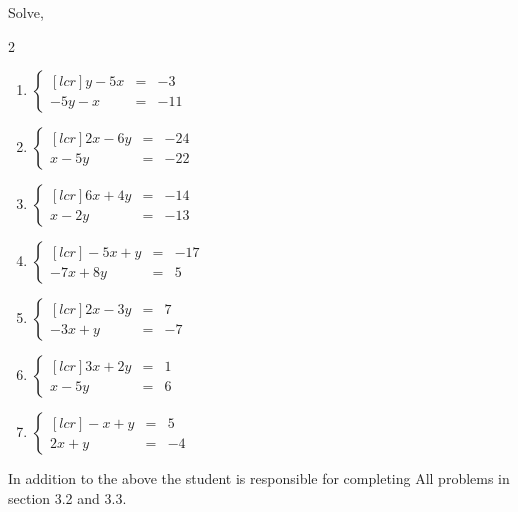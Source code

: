 \documentclass[12pt]{article}
\newenvironment{problem}[2][Problem]{\begin{trivlist}
\item[\hskip \labelsep {\bfseries #1}\hskip \labelsep {\bfseries #2.}]}{\end{trivlist}}
\begin{document}
\begin{problem}{2}
  Solve,
  \begin{multicols}{2}
  \begin{enumerate}[label=\roman*)]
  \item $\displaystyle \left\{\begin{aligned}[lcr] y-5x & = &  -3 \\ -5y-x & = &  -11 \end{aligned}\right.$
  \item $\displaystyle \left\{\begin{aligned}[lcr] 2x-6y & = &  -24 \\ x-5y & = &  -22 \end{aligned}\right.$
  \item $\displaystyle \left\{\begin{aligned}[lcr] 6x+4y & = &  -14 \\ x-2y & = &  -13 \end{aligned}\right.$
  \item $\displaystyle \left\{\begin{aligned}[lcr] -5x+y & = &  -17 \\ -7x+8y & = & 5 \end{aligned}\right.$
  \item $\displaystyle \left\{\begin{aligned}[lcr] 2x-3y & = &  7 \\ -3x+y & = &  -7 \end{aligned}\right.$
  \item $\displaystyle \left\{\begin{aligned}[lcr] 3x+2y & = &  1 \\ x-5y & = &  6 \end{aligned}\right.$
    \item $\displaystyle \left\{\begin{aligned}[lcr] -x+y & = &  5 \\ 2x+y & = &  -4 \end{aligned}\right.$




  \end{enumerate}
\end{multicols}
\end{problem}


\noindent In addition to the above the student is responsible for completing All problems in section 3.2 and 3.3.
\end{document}
